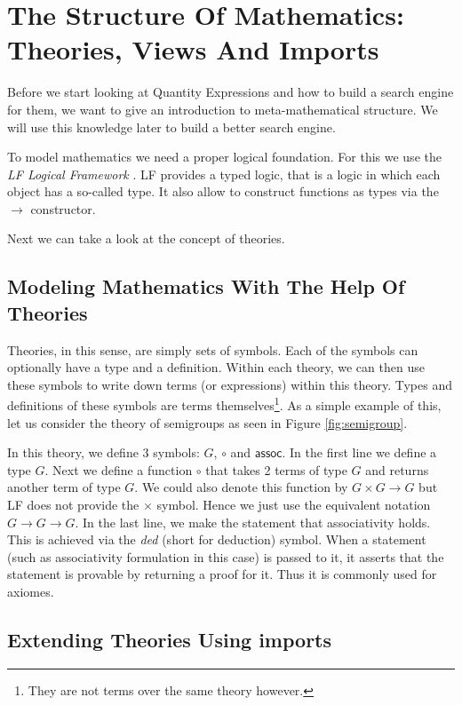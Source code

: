 \section{The Structure Of Mathematics: Theories, Views And Imports}
\label{sec:mathoverview}

Before we start looking at Quantity Expressions and how to build a search engine for them, we want to give an introduction to meta-mathematical structure. We will use this knowledge later to build a better search engine.

To model mathematics we need a proper logical foundation. For this we use the \textit{LF Logical Framework} \cite{hhp93lf}. LF provides a typed logic, that is a logic in which each object has a so-called type. It also allow to construct functions as types via the $\rightarrow$ constructor.

Next we can take a look at the concept of theories.

\subsection{Modeling Mathematics With The Help Of Theories}

Theories, in this sense, are simply sets of symbols. Each of the symbols can optionally have a type and a definition. Within each theory, we can then use these symbols to write down terms (or expressions) within this theory. Types and definitions of these symbols are terms themselves\footnote{They are not terms over the same theory however. }. As a simple example of this, let us consider the theory of semigroups as seen in Figure \ref{fig:semigroup}.



In this theory, we define 3 symbols: $G$, $\circ$ and $\scriptstyle \mathsf{assoc}$. In the first line we define a type $G$. Next we define a function $\circ$ that takes 2 terms of type $G$ and returns another term of type $G$. We could also denote this function by $G \times G \rightarrow G$ but LF does not provide the $\times$ symbol. Hence we just use the equivalent notation $G \rightarrow G \rightarrow G$. In the last line, we make the statement that associativity holds. This is achieved via the \textit{ded} (short for deduction) symbol. When a statement (such as associativity formulation in this case) is passed to it, it asserts that the statement is provable by returning a proof for it. Thus it is commonly used for axiomes.

\subsection{Extending Theories Using imports}

